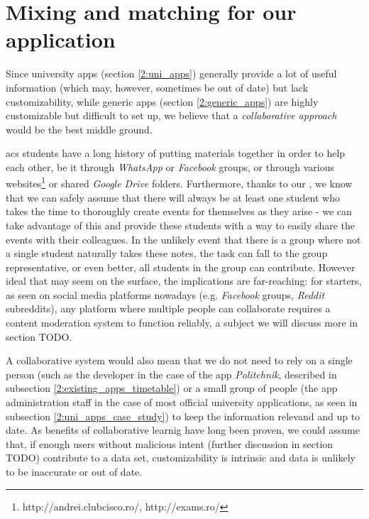 \section{Mixing and matching for our application} \label{2:mix_and_match}

    Since university apps (section \ref{2:uni_apps}) generally provide a lot of useful information (which may, however, sometimes be out of date) but lack customizability, while generic apps (section \ref{2:generic_apps}) are highly customizable but difficult to set up, we believe that a \textit{collaborative approach} would be the best middle ground.
    
    \acrshort{acs} students have a long history of putting materials together in order to help each other, be it through \textit{WhatsApp} or \textit{Facebook} groups, or through various websites\footnote{http://andrei.clubcisco.ro/, http://exams.ro/} or shared \textit{Google Drive} folders. Furthermore, thanks to our \textbf{}, we know that we can safely assume that there will always be at least one student who takes the time to thoroughly create events for themselves as they arise - we can take advantage of this and provide these students with a way to easily share the events with their colleagues. In the unlikely event that there is a group where not a single student naturally takes these notes, the task can fall to the group representative, or even better, all students in the group can contribute. However ideal that may seem on the surface, the implications are far-reaching: for starters, as seen on social media platforms nowadays (e.g. \textit{Facebook} groups, \textit{Reddit} subreddits), any platform where multiple people can collaborate requires a content moderation system\cite{roberts2019behind} to function reliably, a subject we will discuss more in section TODO.
    
    A collaborative system would also mean that we do not need to rely on a single person (such as the developer in the case of the app \textit{Politehnik}, described in subsection \ref{2:existing_apps_timetable}) or a small group of people (the app administration staff in the case of most official university applications, as seen in subsection \ref{2:uni_apps_case_study}) to keep the information relevand and up to date. As benefits of collaborative learnig have long been proven\cite{klemm1997benefits}, we could assume that, if enough users without malicious intent (further discussion in section TODO) contribute to a data set, customizability is intrinsic and data is unlikely to be inaccurate or out of date.
    
